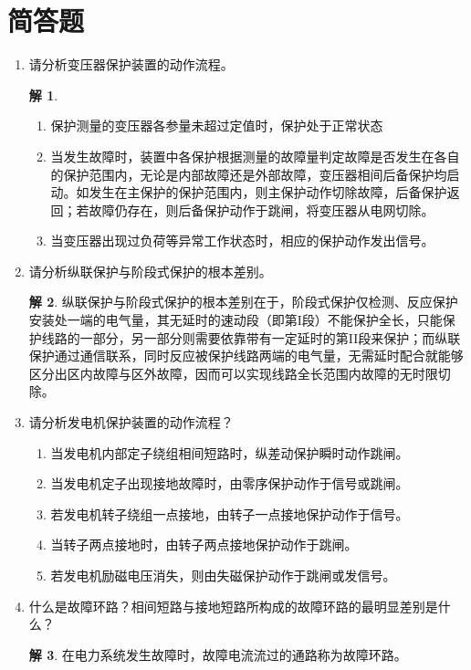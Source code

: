 \documentclass[zihao=-4,fontset = none]{ctexart}
\theoremstyle{definition}
\newtheorem*{solution}{解}
\begin{document}
\section{简答题}
\begin{enumerate}
  \item 请分析变压器保护装置的动作流程。
  \begin{solution}
    \begin{enumerate}
      \item 保护测量的变压器各参量未超过定值时，保护处于正常状态
      \item 当发生故障时，装置中各保护根据测量的故障量判定故障是否发生在各自的保护范围内，无论是内部故障还是外部故障，变压器相间后备保护均启动。如发生在主保护的保护范围内，则主保护动作切除故障，后备保护返回；若故障仍存在，则后备保护动作于跳闸，将变压器从电网切除。
      \item 当变压器出现过负荷等异常工作状态时，相应的保护动作发出信号。
    \end{enumerate}
  \end{solution}
  \item 请分析纵联保护与阶段式保护的根本差别。
  \begin{solution}
    纵联保护与阶段式保护的根本差别在于，阶段式保护仅检测、反应保护安装处一端的电气量，其无延时的速动段（即第I段）不能保护全长，只能保护线路的一部分，另一部分则需要依靠带有一定延时的第II段来保护；而纵联保护通过通信联系，同时反应被保护线路两端的电气量，无需延时配合就能够区分出区内故障与区外故障，因而可以实现线路全长范围内故障的无时限切除。
  \end{solution}
  \item 请分析发电机保护装置的动作流程？
  \begin{enumerate}
    \item 当发电机内部定子绕组相间短路时，纵差动保护瞬时动作跳闸。
    \item 当发电机定子出现接地故障时，由零序保护动作于信号或跳闸。
    \item 若发电机转子绕组一点接地，由转子一点接地保护动作于信号。
    \item 当转子两点接地时，由转子两点接地保护动作于跳闸。
    \item 若发电机励磁电压消失，则由失磁保护动作于跳闸或发信号。
  \end{enumerate}
  \item 什么是故障环路？相间短路与接地短路所构成的故障环路的最明显差别是什么？
  \begin{solution}
    在电力系统发生故障时，故障电流流过的通路称为故障环路。


\end{solution}
\end{enumerate}
\end{document}
